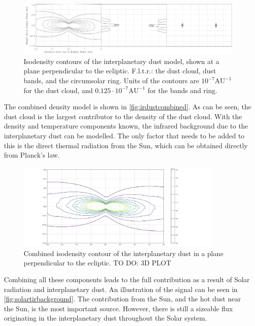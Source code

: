 \begin{figure}[htbp]
 \centering
 \includegraphics[width=1.0\textwidth]{img/ir_dust_components.png}
 \caption{Isodensity contours of the interplanetary dust model, shown at a plane perpendicular to the ecliptic. F.l.t.r.: the dust cloud, dust bands, and the circumsolar ring. Units of the contours are $10^{-7} \mathrm{AU}^{-1}$ for the dust cloud, and $0.125\cdot10^{-7} \mathrm{AU}^{-1}$ for the bands and ring.}
 \label{fig:irdustcontributions}
\end{figure}

The combined density model is shown in \autoref{fig:irdustcombined}. As can be seen, the dust cloud is the largest contributor to the density of the dust cloud. With the density and temperature components known, the infrared background due to the interplanetary dust can be modelled. The only factor that needs to be added to this is the direct thermal radiation from the Sun, which can be obtained directly from Planck's law. \\

\begin{figure}[htbp]
 \centering
 \includegraphics[width=0.9\textwidth]{img/ir_dust_combined.png}
 \caption{Combined isodensity contour of the interplanetary dust in a plane perpendicular to the ecliptic. TO DO: 3D PLOT}
 \label{fig:irdustcombined}
\end{figure}

Combining all these components leads to the full contribution as a result of Solar radiation and interplanetary dust. An illustration of the signal can be seen in \autoref{fig:solartirbackground}. The contribution from the Sun, and the hot dust near the Sun, is the most important source. However, there is still a sizeable flux originating in the interplanetary dust throughout the Solar system.\\


